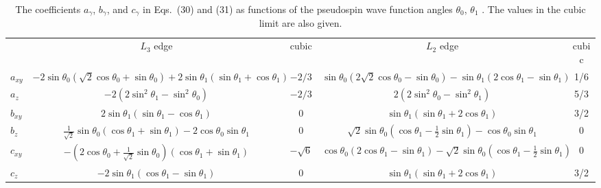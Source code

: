 \documentclass[twocolumn,prb,aps,showpacs,superscriptaddress]{revtex4-1}
\begin{document}
\begin{table*}

	\begin{tabularx}{1.0\textwidth}{|l|c|c||c|c|}
		\multicolumn{1}{c}{}& 
		\multicolumn{1}{c}{$L_3$ edge} &
		\multicolumn{1}{c}{cubic}& 
		\multicolumn{1}{c}{$L_2$ edge}&
		\multicolumn{1}{c}{cubic}\\	 
		\cline{1-5} 
		$a_{xy}$ &
                $-2\sin{\theta_0}(\sqrt{2}\cos{\theta_0}+\sin{\theta_0})+
2\sin{\theta_1}(\sin{\theta_1}+\cos{\theta_1})$
                &$-2/3$
                &$\sin{\theta_0}(2\sqrt{2}\cos{\theta_0}-\sin{\theta_0})-
\sin{\theta_1}(2\cos{\theta_1}-\sin{\theta_1})
                $& 1/6\\  
		\cline{1-5}
		$a_z$ & $-2(2\sin^2{\theta_1}-\sin^2{\theta_0})$ & $-2/3$  
& $2(2\sin^2{\theta_0}-\sin^2{\theta_1})$ & 5/3 \\
		\cline{1-5} 
		$b_{xy}$  & $2\sin{\theta_1}(\sin{\theta_1}-\cos{\theta_1})$ 
& 0& $\sin{\theta_1}(\sin{\theta_1}+2\cos{\theta_1})$ & 3/2 \\
		\cline{1-5}
		$b_{z}$ &
                $\frac{1}{\sqrt{2}}\sin{\theta_0}(\cos{\theta_1}+
\sin{\theta_1})-2\cos{\theta_0}\sin{\theta_1}$
                & 0 &
                $\sqrt{2}\sin{\theta_0}(\cos{\theta_1}-\frac{1}{2}
\sin{\theta_1})-\cos{\theta_0}\sin{\theta_1}$
                & 0 \\ 
		\cline{1-5}
		$c_{xy}$ &
                $-(2\cos{\theta_0}+\frac{1}{\sqrt{2}}\sin{\theta_0})
(\cos{\theta_1}+\sin{\theta_1})$
                & $-\sqrt{6}$ &
                $\cos{\theta_0}(2\cos{\theta_1}-\sin{\theta_1})-
\sqrt{2}\sin{\theta_0}(\cos{\theta_1}-\frac{1}{2}\sin{\theta_1})$
                & 0 \\ 
		\cline{1-5}
		$c_z$ & $-2\sin{\theta_1}(\cos{\theta_1}-
\sin{\theta_1})$ & 0 & $\sin{\theta_1}(\sin{\theta_1}+2\cos{\theta_1})$ & 3/2 \\
		\cline{1-5}
	\end{tabularx}
\caption{The coefficients $a_\gamma$, $b_\gamma$, and $c_\gamma$ in Eqs.~(30)
         and (31) as functions of the pseudospin wave function angles 
         $\theta_0$, $\theta_1$ . The values in the cubic limit are also given.}
\label{tab:tab2} 
\end{table*}
\end{document}

